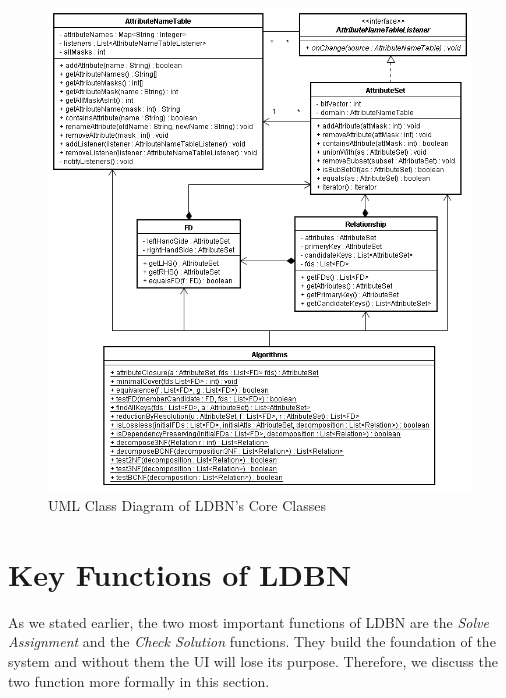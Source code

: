 \begin{figure}[htbp]
  \begin{center}
\hspace*{-0.5cm}\includegraphics[width=1.08\textwidth]{./img/uml-std.png}
    \caption{UML Class Diagram of LDBN's Core Classes}
    \label{fig:coreuml}
  \end{center}
\end{figure}



\section{Key Functions of LDBN}
\label{sec:keyfunctions}
As we stated earlier, the two most important functions of LDBN are the \textit{Solve Assignment} and 
the \textit{Check Solution} functions. They build the foundation of the system and
without them the UI will lose its purpose. Therefore, we
discuss the two function more formally in this section.

